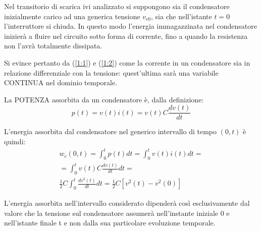 \documentclass[a4paper, 12pt, twoside]{report}
\begin{document}
Nel transitorio di scarica ivi analizzato si suppongono sia il condensatore inizialmente carico ad una generica tensione $v_{c0}$, sia che nell’istante $t=0$ l’interruttore si chiuda. In questo modo l'energia immagazzinata nel condensatore inizierà a fluire nel circuito sotto forma di corrente, fino a quando la resistenza non l'avrà totalmente dissipata.{}

Si evince pertanto da (\ref{1:1}) e (\ref{1:2}) come la corrente in un condensatore sia in relazione differenziale con la tensione: quest’ultima sarà una variabile CONTINUA nel dominio temporale. 

La POTENZA assorbita da un condensatore è, dalla definizione:
\[
p\left(t\right)=v\left(t\right)i\left(t\right)=v\left(t\right)C\frac{dv\left(t\right)}{dt}
\]

L’energia assorbita dal condensatore nel generico intervallo di tempo $(0,t)$ è quindi:
\begin{equation}
	\begin{split}
w_c\left(0,t\right)=\int_{0}^{t}p\left(t\right)dt=\int_{0}^{t}v\left(t\right)i\left(t\right)dt=\\
=\int_{0}^{t}{v\left(t\right)C\frac{dv\left(t\right)}{dt}dt}= \\
\frac{1}{2}C\int_{0}^{t}{\frac{dv^2\left(t\right)}{dt}dt}= 
\frac{1}{2}C\left[v^2\left(t\right)-v^2\left(0\right)\right]
\end{split}
\end{equation}

L’energia assorbita nell’intervallo considerato dipenderà così esclusivamente dal valore che la tensione sul condensatore assumerà nell’instante iniziale 0 e nell’istante finale t e non dalla sua particolare evoluzione temporale.
\end{document}
